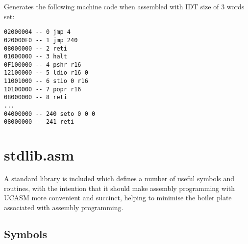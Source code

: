 \documentclass[12pt,twoside]{report}
\begin{document}
Generates the following machine code when assembled with IDT size of 3
words set:

\begin{verbatim}
02000004 -- 0 jmp 4
020000F0 -- 1 jmp 240
08000000 -- 2 reti
01000000 -- 3 halt
0F100000 -- 4 pshr r16
12100000 -- 5 ldio r16 0
11001000 -- 6 stio 0 r16
10100000 -- 7 popr r16
08000000 -- 8 reti
...
04000000 -- 240 seto 0 0 0
08000000 -- 241 reti
\end{verbatim}

\newpage
\section{stdlib.asm}

A standard library is included which defines a number of useful
symbols and routines, with the intention that it should make assembly
programming with UCASM more convenient and succinct, helping to
minimise the boiler plate associated with assembly programming.

\subsection{Symbols}
\end{document}
